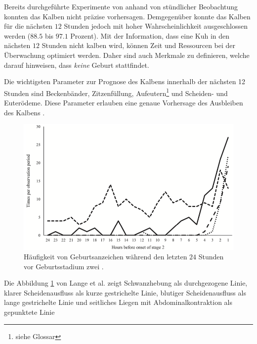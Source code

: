Bereits durchgeführte Experimente von \citep[S. 1]{Lange2017} anhand von stündlicher Beobachtung konnten das Kalben nicht präzise vorhersagen. Demgegenüber konnte das Kalben für die nächsten $12$ Stunden jedoch mit hoher Wahrscheinlichkeit ausgeschlossen werden ($88.5$ bis $97.1$ Prozent). Mit der Information, dass eine Kuh in den nächsten $12$ Stunden nicht kalben wird, können Zeit und Ressourcen bei der Überwachung optimiert werden. Daher sind auch Merkmale zu definieren, welche darauf hinweisen, dass \textit{keine} Geburt stattfindet.

Die wichtigsten Parameter zur Prognose des Kalbens innerhalb der nächsten 12 Stunden sind Beckenbänder, Zitzenfüllung, \gls{Aufeutern}\footnote{siehe Glossar} und Scheiden- und Euterödeme. Diese Parameter erlauben eine genaue Vorhersage des Ausbleiben des Kalbens \citep[S. 4]{Streyl2011}.



\begin{figure}[H]
	\center
	\includegraphics[scale=.45]{Grafiken/observationTimes.png}
	\caption{Häufigkeit von Geburtsanzeichen während den letzten $24$ Stunden vor Geburtsstadium zwei \citep[S.5]{Lange2017}.}
	\label{fig: Häufigkeit von Geburtsanzeichen }
\end{figure}

Die Abbildung \ref{fig: Häufigkeit von Geburtsanzeichen } von Lange et al. zeigt Schwanzhebung als durchgezogene Linie, klarer Scheidenausfluss als kurze gestrichelte Linie,  blutiger Scheidenausfluss als lange gestrichelte Linie und seitliches Liegen mit Abdominalkontraktion als gepunktete Linie
